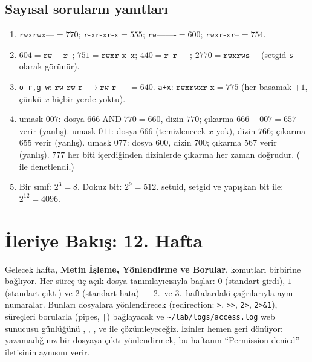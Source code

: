 \subsection*{Sayısal soruların yanıtları}
\begin{enumerate}[leftmargin=1.6em,start=9]
  \item $\texttt{rwxrwx---} = 770$; $\texttt{r-xr-xr-x} = 555$; $\texttt{rw-------} = 600$; $\texttt{rwxr-xr--} = 754$.
  \item $604 = \texttt{rw----r--}$; $751 = \texttt{rwxr-x--x}$; $440 = \texttt{r--r-----}$; $2770 = \texttt{rwxrws---}$ (setgid \texttt{s} olarak görünür).
  \item \texttt{o-r,g-w}: $\texttt{rw-rw-r--} \to \texttt{rw-r-----} = 640$. \texttt{a+x}: $\texttt{rwxrwxr-x} = 775$ (her basamak $+1$, çünkü $x$ hiçbir yerde yoktu).
  \item umask $007$: dosya $666 \mathbin{\text{AND}} 770 = 660$, dizin $770$; çıkarma $666-007 = 657$ verir (yanlış). umask $011$: dosya $666$ (temizlenecek $x$ yok), dizin $766$; çıkarma $655$ verir (yanlış). umask $077$: dosya $600$, dizin $700$; çıkarma $567$ verir (yanlış). $777$ her biti içerdiğinden dizinlerde çıkarma her zaman doğrudur. ( ile denetlendi.)
  \item Bir sınıf: $2^3 = 8$. Dokuz bit: $2^9 = 512$. setuid, setgid ve yapışkan bit ile: $2^{12} = 4096$.
\end{enumerate}

\section{İleriye Bakış: 12. Hafta}

Gelecek hafta, \textbf{Metin İşleme, Yönlendirme ve Borular}, komutları birbirine bağlıyor. Her süreç üç açık dosya tanımlayıcısıyla başlar: $0$ (standart girdi), $1$ (standart çıktı) ve $2$ (standart hata) --- 2.\ ve 3.~haftalardaki  çağrılarıyla aynı numaralar. Bunları dosyalara yönlendirecek (redirection: \texttt{>}, \texttt{>>}, \texttt{2>}, \texttt{2>\&1}), süreçleri borularla (pipes, \texttt{|}) bağlayacak ve \texttt{\textasciitilde/lab/logs/access.log} web sunucusu günlüğünü , , ,  ve  ile çözümleyeceğiz. İzinler hemen geri dönüyor: yazamadığınız bir dosyaya çıktı yönlendirmek, bu haftanın ``Permission denied'' iletisinin aynısını verir.

